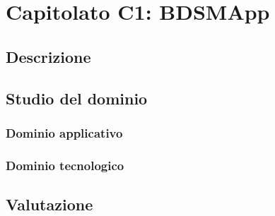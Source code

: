 %


\section{Capitolato C1: BDSMApp}

\subsection{Descrizione}

\subsection{Studio del dominio}
\subsubsection{Dominio applicativo}
\subsubsection{Dominio tecnologico}

\subsection{Valutazione}